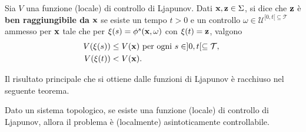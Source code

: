 \begin{definition}
    \label{def:ben-raggiungibile}
    Sia $V$ una funzione (locale) di controllo di Ljapunov.
    Dati $\mathbf{x}, \mathbf{z} \in \Sigma$, si dice che $\mathbf{z}$ è \textbf{ben raggiungibile
    da} $\mathbf{x}$ se esiste un tempo $t > 0$ e un controllo $\omega \in \mathcal U^{[0,t[ \subseteq \mathcal T}$ ammesso per $\mathbf{x}$
    tale che per $\xi(s) = \phi^s(\mathbf{x}, \omega)$ con $\xi(t) = \mathbf{z}$, valgono
    \begin{align*}
        V(\xi(s)) &\leq V(\mathbf{x}) \text{ per ogni } s \in ]0,t[ \subseteq \mathcal T,~\\
        V(\xi(t)) &< V(\mathbf{x}).
    \end{align*}
    \vspace{-1cm}
\end{definition}

Il risultato principale che si ottiene dalle funzioni di Ljapunov è racchiuso nel seguente teorema.
\begin{thm}
    Dato un sistema topologico, se esiste una funzione (locale) di controllo di Ljapunov,
    allora il problema è (localmente) asintoticamente controllabile.
    \label{thm:ljapunov}
\end{thm}

